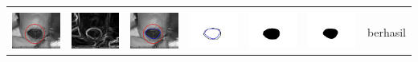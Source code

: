 \begin{table}[H]
\begin{tabular}{|m{0.7in}|m{0.7in}|m{0.7in}|m{0.7in}|m{0.7in}|m{0.7in}|m{0.7in}|}
		&  &  & & & &  \\
		\includegraphics[width=0.7in]{dataset/dataset_3/luka_hitam/ready/6_interp_init.jpg}&
		\includegraphics[width=0.7in]{dataset/dataset_3/luka_hitam/ready/6_interp_ext.jpg}&
		\includegraphics[width=0.7in]{dataset/dataset_3/luka_hitam/ready/6_interp_result.jpg}&
		\includegraphics[width=0.7in]{dataset/dataset_3/luka_hitam/ready/6_gt_r.jpg}&
		\includegraphics[width=0.7in]{dataset/dataset_3/luka_hitam/ready/6_r.jpg}&
		\includegraphics[width=0.7in]{dataset/dataset_3/luka_hitam/ready/6_interp_r.jpg}&
		berhasil\\
		\hline
		

\end{tabular}
\end{table}
